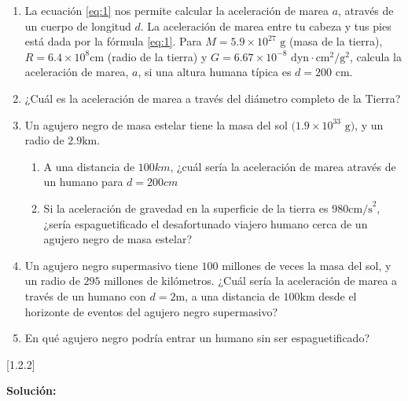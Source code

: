 \documentclass[a4paper]{article}
\newcounter{problema}
\begin{document}
\begin{problema}
    \begin{enumerate}
        \item La ecuación \ref{eq:1} nos permite calcular la aceleración de marea $a$, através de un
        cuerpo de longitud $d$. La aceleración de marea entre tu cabeza y tus pies está dada por la fórmula \ref{eq:1}. 
        Para $M = 5.9\times 10^{27} \text{ g}$ (masa de la tierra), $R=6.4\times 10^8 \text{cm}$ (radio de la tierra) y
        $G=6.67\times 10^{-8} \text{ dyn} \cdot \text{cm}^2/\text{g}^2$, calcula la aceleración de marea, $a$, 
        si una altura humana típica es $d=200\text{ cm}$.
        \item ¿Cuál es la aceleración de marea a través del diámetro completo de la Tierra?
        \item Un agujero negro de masa estelar tiene la masa del sol $(1.9\times 10^{33}\text{ g)}$, 
        y un radio de $2.9 \text{km}$.
        \begin{enumerate}
            \item A una distancia de $100km$, ¿cuál sería la aceleración de marea através de un humano para $d=200cm$
            \item Si la aceleración de gravedad en la superficie de la tierra es $980 	\text{cm/s}^2$, 
            ¿sería espaguetificado el desafortunado viajero humano cerca de un agujero negro de masa estelar?
        \end{enumerate}
        \item Un agujero negro supermasivo tiene $100$ millones de veces la masa del sol, y un radio de $295$ millones de kilómetros.
        ¿Cuál sería la aceleración de marea a través de un humano con $d=2\text{m}$, a una distancia de $100\text{km}$ desde el horizonte 
        de eventos del agujero negro supermasivo?
        \item En qué agujero negro podría entrar un humano sin ser espaguetificado?
    \end{enumerate}
    
\end{problema} [1.2.2]

\textbf{Solución:}  
\end{document}
